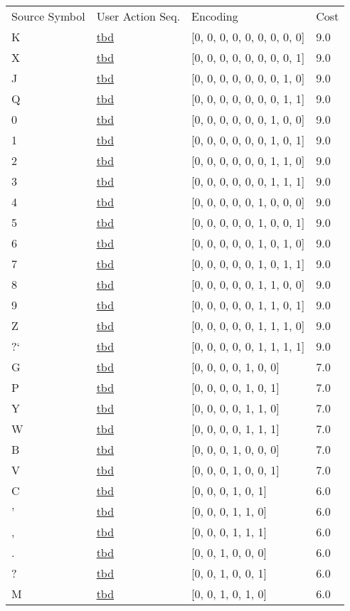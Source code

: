 \documentclass[12pt]{article}
\begin{document}
\begin{tabular}{l l l l}
Source Symbol	&	User Action Seq.	&	Encoding	&	Cost\\
K	&	\url{tbd}	&	[0, 0, 0, 0, 0, 0, 0, 0, 0]	&	9.0\\
X	&	\url{tbd}	&	[0, 0, 0, 0, 0, 0, 0, 0, 1]	&	9.0\\
J	&	\url{tbd}	&	[0, 0, 0, 0, 0, 0, 0, 1, 0]	&	9.0\\
Q	&	\url{tbd}	&	[0, 0, 0, 0, 0, 0, 0, 1, 1]	&	9.0\\
0	&	\url{tbd}	&	[0, 0, 0, 0, 0, 0, 1, 0, 0]	&	9.0\\
1	&	\url{tbd}	&	[0, 0, 0, 0, 0, 0, 1, 0, 1]	&	9.0\\
2	&	\url{tbd}	&	[0, 0, 0, 0, 0, 0, 1, 1, 0]	&	9.0\\
3	&	\url{tbd}	&	[0, 0, 0, 0, 0, 0, 1, 1, 1]	&	9.0\\
4	&	\url{tbd}	&	[0, 0, 0, 0, 0, 1, 0, 0, 0]	&	9.0\\
5	&	\url{tbd}	&	[0, 0, 0, 0, 0, 1, 0, 0, 1]	&	9.0\\
6	&	\url{tbd}	&	[0, 0, 0, 0, 0, 1, 0, 1, 0]	&	9.0\\
7	&	\url{tbd}	&	[0, 0, 0, 0, 0, 1, 0, 1, 1]	&	9.0\\
8	&	\url{tbd}	&	[0, 0, 0, 0, 0, 1, 1, 0, 0]	&	9.0\\
9	&	\url{tbd}	&	[0, 0, 0, 0, 0, 1, 1, 0, 1]	&	9.0\\
Z	&	\url{tbd}	&	[0, 0, 0, 0, 0, 1, 1, 1, 0]	&	9.0\\
?`	&	\url{tbd}	&	[0, 0, 0, 0, 0, 1, 1, 1, 1]	&	9.0\\
G	&	\url{tbd}	&	[0, 0, 0, 0, 1, 0, 0]	&	7.0\\
P	&	\url{tbd}	&	[0, 0, 0, 0, 1, 0, 1]	&	7.0\\
Y	&	\url{tbd}	&	[0, 0, 0, 0, 1, 1, 0]	&	7.0\\
W	&	\url{tbd}	&	[0, 0, 0, 0, 1, 1, 1]	&	7.0\\
B	&	\url{tbd}	&	[0, 0, 0, 1, 0, 0, 0]	&	7.0\\
V	&	\url{tbd}	&	[0, 0, 0, 1, 0, 0, 1]	&	7.0\\
C	&	\url{tbd}	&	[0, 0, 0, 1, 0, 1]	&	6.0\\
'	&	\url{tbd}	&	[0, 0, 0, 1, 1, 0]	&	6.0\\
,	&	\url{tbd}	&	[0, 0, 0, 1, 1, 1]	&	6.0\\
.	&	\url{tbd}	&	[0, 0, 1, 0, 0, 0]	&	6.0\\
?	&	\url{tbd}	&	[0, 0, 1, 0, 0, 1]	&	6.0\\
M	&	\url{tbd}	&	[0, 0, 1, 0, 1, 0]	&	6.0\\

\end{tabular}
\end{document}
